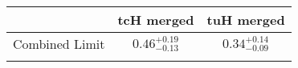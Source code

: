 \centering
\begin{tabular}{ccc} \toprule\toprule
 & tcH merged & tuH merged\\\midrule
Combined Limit & $0.46^{+0.19}_{-0.13}$ & $0.34^{+0.14}_{-0.09}$\\
\bottomrule\bottomrule\\
\end{tabular}